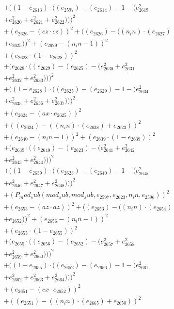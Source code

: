 \documentclass[10pt, a4paper]{article}
\begin{document}
\begin{align*}
& + ((1 - e_{2613})  \cdot  ((e_{2597}) - (e_{2614}) - 1 - (e_{2619}^{2} \\
& + e_{2620}^{2} + e_{2621}^{2} + e_{2622}^{2})))^{2} \\
& + (e_{2626} - (cz  \cdot  cz))^{2} + ((e_{2626}) - ((n_in)  \cdot  (e_{2627}) \\
& + e_{2625}))^{2} + (e_{2629} - (n_in - 1))^{2} \\
& + (e_{2628}  \cdot  (1 - e_{2628}))^{2} \\
& + (e_{2628}  \cdot  ((e_{2629}) - (e_{2625}) - (e_{2630}^{2} + e_{2631}^{2} \\
& + e_{2632}^{2} + e_{2633}^{2})))^{2} \\
& + ((1 - e_{2628})  \cdot  ((e_{2625}) - (e_{2629}) - 1 - (e_{2634}^{2} \\
& + e_{2635}^{2} + e_{2636}^{2} + e_{2637}^{2})))^{2} \\
& + (e_{2624} - (ax  \cdot  e_{2625}))^{2} \\
& + ((e_{2624}) - ((n_in)  \cdot  (e_{2638}) + e_{2623}))^{2} \\
& + (e_{2640} - (n_in - 1))^{2} + (e_{2639}  \cdot  (1 - e_{2639}))^{2} \\
& + (e_{2639}  \cdot  ((e_{2640}) - (e_{2623}) - (e_{2641}^{2} + e_{2642}^{2} \\
& + e_{2643}^{2} + e_{2644}^{2})))^{2} \\
& + ((1 - e_{2639})  \cdot  ((e_{2623}) - (e_{2640}) - 1 - (e_{2645}^{2} \\
& + e_{2646}^{2} + e_{2647}^{2} + e_{2648}^{2})))^{2} \\
& + (P_mod_sub(mod_sub, mod_sub, e_{2597}, e_{2623}, n_in, e_{2596}))^{2} \\
& + (e_{2653} - (az  \cdot  az))^{2} + ((e_{2653}) - ((n_in)  \cdot  (e_{2654}) \\
& + e_{2652}))^{2} + (e_{2656} - (n_in - 1))^{2} \\
& + (e_{2655}  \cdot  (1 - e_{2655}))^{2} \\
& + (e_{2655}  \cdot  ((e_{2656}) - (e_{2652}) - (e_{2657}^{2} + e_{2658}^{2} \\
& + e_{2659}^{2} + e_{2660}^{2})))^{2} \\
& + ((1 - e_{2655})  \cdot  ((e_{2652}) - (e_{2656}) - 1 - (e_{2661}^{2} \\
& + e_{2662}^{2} + e_{2663}^{2} + e_{2664}^{2})))^{2} \\
& + (e_{2651} - (cx  \cdot  e_{2652}))^{2} \\
& + ((e_{2651}) - ((n_in)  \cdot  (e_{2665}) + e_{2650}))^{2} \\

\end{align*}
\end{document}
